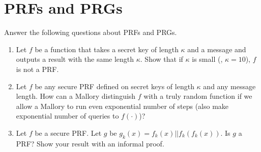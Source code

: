 \newpage
\section{PRFs and PRGs}

 Answer the following questions about PRFs and PRGs.

\begin{enumerate}
    \item Let $f$ be a function that takes a secret key of length
      $\kappa$ and a message and outputs a result 
        with the same length $\kappa$. Show that if $\kappa$ is small
        (\eg, $\kappa = 10$), $f$ is not a PRF. 


    \item Let $f$ be any secure PRF defined on secret keys of length $\kappa$ and any message length. 
        How can a Mallory distinguish $f$ with a truly random function
        if we allow a Mallory to run even exponential number of steps (also make
        exponential number of queries to $f(\cdot)$)?


    \item Let $f$ be a secure PRF. Let $g$ be $g_k(x) = f_k(x)||f_k(f_k(x))$. Is $g$ a PRF? 
    Show your result with an informal proof. 




\end{enumerate}
\eprob